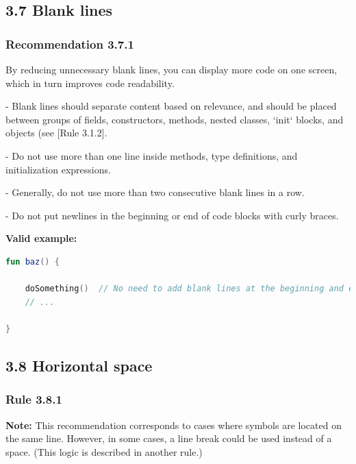{{\subsection*{\textbf{3.7 Blank lines}}

\subsubsection*{\textbf{Recommendation 3.7.1}}
\leavevmode\newline



By reducing unnecessary blank lines, you can display more code on one screen, which in turn improves code readability.



- Blank lines should separate content based on relevance, and should be placed between groups of fields, constructors, methods, nested classes, `init` blocks, and objects (see [Rule 3.1.2].

- Do not use more than one line inside methods, type definitions, and initialization expressions.

- Generally, do not use more than two consecutive blank lines in a row.

- Do not put newlines in the beginning or end of code blocks with curly braces.



\textbf{Valid example:}

\begin{lstlisting}[language=Kotlin]
fun baz() {

    doSomething()  // No need to add blank lines at the beginning and end of the code block
    // ...

}
\end{lstlisting}


\subsection*{\textbf{3.8 Horizontal space}}

\subsubsection*{\textbf{Rule 3.8.1}}
\leavevmode\newline



\textbf{Note:} This recommendation corresponds to cases where symbols are located on the same line. However, in some cases, a line break could be used instead of a space. (This logic is described in another rule.)



}}
